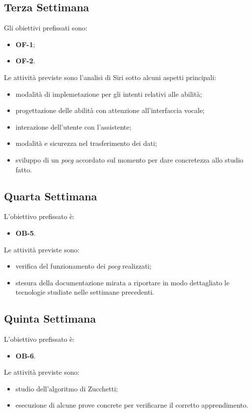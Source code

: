 	\subsection*{Terza Settimana}
	Gli obiettivi prefissati sono:
	\begin{itemize}
		\item \textbf{OF-1};
		\item \textbf{OF-2}.
	\end{itemize}
	Le attività previste sono l'analisi di Siri sotto alcuni aspetti principali:
	\begin{itemize}
		\item modalità di implemetazione per gli intenti relativi alle abilità;
		\item progettazione delle abilità con attenzione all'interfaccia vocale;
		\item interazione dell'utente con l'assistente;
		\item modalità e sicurezza nel trasferimento dei dati;
		\item sviluppo di un \emph{\gls{pocg}} accordato sul momento per dare concretezza allo studio fatto.
	\end{itemize}
	\subsection*{Quarta Settimana}
	L'obiettivo prefissato è:
	\begin{itemize}
		\item \textbf{OB-5}.
	\end{itemize}
	Le attività previste sono:
	\begin{itemize}
		\item verifica del funzionamento dei \emph{\gls{pocg}} realizzati;
		\item stesura della documentazione mirata a riportare in modo dettagliato le tecnologie studiate nelle settimane precedenti.
	\end{itemize}
	\subsection*{Quinta Settimana}
	L'obiettivo prefissato è:
	\begin{itemize}
		\item \textbf{OB-6}.
	\end{itemize}
	Le attività previste sono:
	\begin{itemize}
		\item studio dell'algoritmo di Zucchetti;
		\item esecuzione di alcune prove concrete per verificarne il corretto apprendimento.
	\end{itemize}
